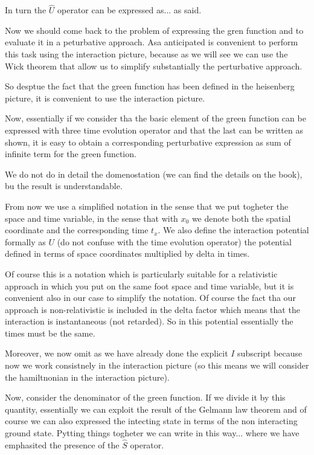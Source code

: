 \documentclass[../main/main.tex]{subfiles}
\begin{document}
In turn the \( \hat{U}  \) operator can be expressed as...
as said.

Now we should come back to the problem of expressing the gren function and to evaluate it in a peturbative approach.
Asa anticipated is convenient to perform this task using the interaction picture, because as we will see we can use the Wick theorem that allow us to simplify substantially the perturbative approach.

So desptue the fact that the green function has been defined in the heisenberg picture, it is convenient to use the interaction picture.

Now, essentially if we consider tha the basic element of the green function can be expressed with three time evolution operator and that the last can be written as shown, it is easy to obtain a corresponding perturbative expression as sum of infinite term for the green function.

We do not do in detail the domenostation (we can find the details on the book), bu the result is understandable.

From now we use a simplified notation in the sense that we put togheter the space and time variable, in the sense that with \( x_0 \) we denote both the spatial coordinate and the corresponding time \( t_x \). We also define the
interaction potential formally as \( U \) (do not confuse with the time evolution operator)  the potential defined in terms of space coordinates multiplied by delta in times.

Of course this is a notation which is particularly suitable for a relativistic approach in which you put on the same foot space and time variable, but it is convenient also in our case to simplify the notation.
Of course the fact tha our approach is non-relativistic is included in the delta factor which means that the interaction is instantaneous (not retarded). So in this potential essentially the times must be the same.


Moreover, we now omit as we have already done the explicit \( I \) subscript because now we work consistnely in the interaction picture (so this means we will consider the hamiltnonian in the interaction picture).

Now, consider the denominator of the green function. If we divide it by this quantity, essentially we can exploit the result of the Gelmann law theorem and of course we can also expressed the intecting state in terms of the non interacting ground state. Pytting things togheter we can write in this way... where we have emphasited the presence of the \( \hat{S}  \) operator.
\end{document}
